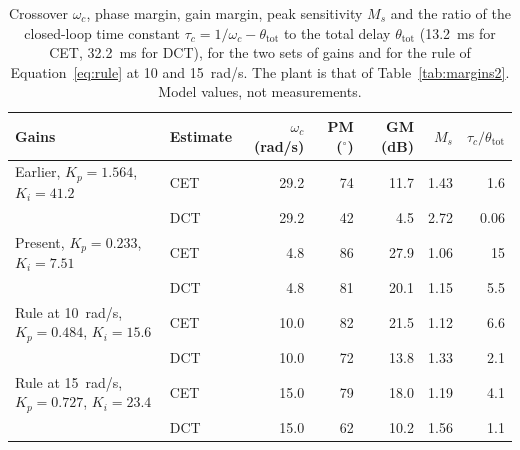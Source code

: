 \begin{table}[htbp]
    \centering
    \caption[Textbook robustness measures for candidate crossovers]{Crossover $\omega_c$, phase margin, gain margin, peak sensitivity $M_s$ and the ratio of the closed-loop time constant $\tau_c = 1/\omega_c - \theta_{\mathrm{tot}}$ to the total delay $\theta_{\mathrm{tot}}$ (13.2~ms for CET, 32.2~ms for DCT), for the two sets of gains and for the rule of Equation~\ref{eq:rule} at 10 and 15~rad/s. The plant is that of Table~\ref{tab:margins2}. Model values, not measurements.}
    \label{tab:robust}
    \small
    \begin{tabular}{@{}llrrrrr@{}}
        \toprule
        Gains & Estimate & $\omega_c$ (rad/s) & PM ($^{\circ}$) & GM (dB) & $M_s$ & $\tau_c/\theta_{\mathrm{tot}}$ \\
        \midrule
        Earlier, $K_p = 1.564$, $K_i = 41.2$ & CET & 29.2 & 74 & 11.7 & 1.43 & 1.6 \\
        & DCT & 29.2 & 42 & 4.5 & 2.72 & 0.06 \\
        Present, $K_p = 0.233$, $K_i = 7.51$ & CET & 4.8 & 86 & 27.9 & 1.06 & 15 \\
        & DCT & 4.8 & 81 & 20.1 & 1.15 & 5.5 \\
        Rule at 10~rad/s, $K_p = 0.484$, $K_i = 15.6$ & CET & 10.0 & 82 & 21.5 & 1.12 & 6.6 \\
        & DCT & 10.0 & 72 & 13.8 & 1.33 & 2.1 \\
        Rule at 15~rad/s, $K_p = 0.727$, $K_i = 23.4$ & CET & 15.0 & 79 & 18.0 & 1.19 & 4.1 \\
        & DCT & 15.0 & 62 & 10.2 & 1.56 & 1.1 \\
        \bottomrule
    \end{tabular}
\end{table}

